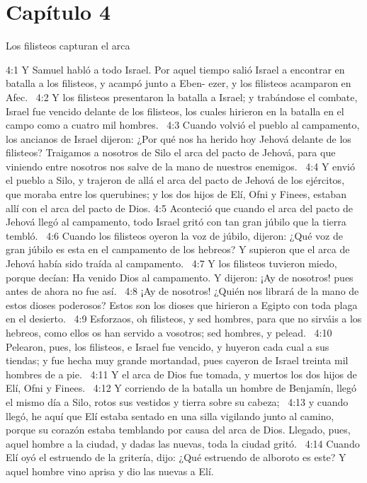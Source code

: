 \section*{Capítulo 4}
Los filisteos capturan el arca  

4:1 Y Samuel habló a todo Israel. Por aquel tiempo salió Israel a encontrar en batalla a los filisteos, y acampó junto a Eben- ezer, y los filisteos acamparon en Afec.  
4:2 Y los filisteos presentaron la batalla a Israel; y trabándose el combate, Israel fue vencido delante de los filisteos, los cuales hirieron en la batalla en el campo como a cuatro mil hombres.  
4:3 Cuando volvió el pueblo al campamento, los ancianos de Israel dijeron: ¿Por qué nos ha herido hoy Jehová delante de los filisteos? Traigamos a nosotros de Silo el arca del pacto de Jehová, para que viniendo entre nosotros nos salve de la mano de nuestros enemigos.  
4:4 Y envió el pueblo a Silo, y trajeron de allá el arca del pacto de Jehová de los ejércitos, que moraba entre los querubines; y los dos hijos de Elí, Ofni y Finees, estaban allí con el arca del pacto de Dios. 
4:5 Aconteció que cuando el arca del pacto de Jehová llegó al campamento, todo Israel gritó con tan gran júbilo que la tierra tembló.  
4:6 Cuando los filisteos oyeron la voz de júbilo, dijeron: ¿Qué voz de gran júbilo es esta en el campamento de los hebreos? Y supieron que el arca de Jehová había sido traída al campamento.  
4:7 Y los filisteos tuvieron miedo, porque decían: Ha venido Dios al campamento. Y dijeron: ¡Ay de nosotros! pues antes de ahora no fue así.  
4:8 ¡Ay de nosotros! ¿Quién nos librará de la mano de estos dioses poderosos? Estos son los dioses que hirieron a Egipto con toda plaga en el desierto.  
4:9 Esforzaos, oh filisteos, y sed hombres, para que no sirváis a los hebreos, como ellos os han servido a vosotros; sed hombres, y pelead.  
4:10 Pelearon, pues, los filisteos, e Israel fue vencido, y huyeron cada cual a sus tiendas; y fue hecha muy grande mortandad, pues cayeron de Israel treinta mil hombres de a pie.  
4:11 Y el arca de Dios fue tomada, y muertos los dos hijos de Elí, Ofni y Finees.  
4:12 Y corriendo de la batalla un hombre de Benjamín, llegó el mismo día a Silo, rotos sus vestidos y tierra sobre su cabeza;  
4:13 y cuando llegó, he aquí que Elí estaba sentado en una silla vigilando junto al camino, porque su corazón estaba temblando por causa del arca de Dios. Llegado, pues, aquel hombre a la ciudad, y dadas las nuevas, toda la ciudad gritó.  
4:14 Cuando Elí oyó el estruendo de la gritería, dijo: ¿Qué estruendo de alboroto es este? Y aquel hombre vino aprisa y dio las nuevas a Elí.  
